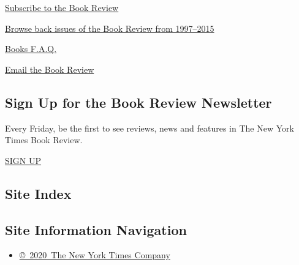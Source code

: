 \href{https://homedelivery.nytimes.com/HDS/BookReviewHome.do?mode=BookReviewHome\&ref=review}{Subscribe
to the Book Review}

\href{https://www.nytimes.com/2014/07/29/books/review/the-new-york-times-book-review-back-issues.html}{Browse
back issues of the Book Review from 1997--2015}

\href{https://www.nytimes.com/membercenter/faq/books.html?ref=review}{Books
F.A.Q.}

\href{mailto:books@nytimes.com}{Email the Book Review}

\hypertarget{sign-up-for-the-book-review-newsletter}{%
\subsection{Sign Up for the Book Review
Newsletter}\label{sign-up-for-the-book-review-newsletter}}

Every Friday, be the first to see reviews, news and features in The New
York Times Book Review.

\href{/newsletters/signup/BK}{SIGN UP}

\hypertarget{site-index}{%
\subsection{Site Index}\label{site-index}}

\hypertarget{site-information-navigation}{%
\subsection{Site Information
Navigation}\label{site-information-navigation}}

\begin{itemize}
\tightlist
\item
  \href{https://help.nytimes.com/hc/en-us/articles/115014792127-Copyright-notice}{©~2020~The
  New York Times Company}
\end{itemize}

